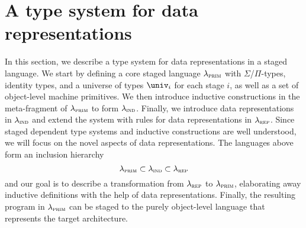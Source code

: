 \newcommand{\lambdaprim}{\lambda_{\textsc{prim}}}
\newcommand{\lambdaind}{\lambda_{\textsc{ind}}}
\newcommand{\lambdarep}{\lambda_{\textsc{rep}}}

\newcommand{\lab}[1]{{\ensuremath{\color{blue}{\mathsf{#1}}}}}
\newcommand{\kwd}[1]{\mta{\myuline{#1}}}
\newcommand{\Sdata}[2]{\kwd{data} \ \lab{#1} \, {#2} : \univ_1}
\newcommand{\Sctor}[4]{\kwd{ctor} \ \lab{#1} \, {#2} : \lab{#3}\, {#4}}
\newcommand{\Sctorvar}[4]{\kwd{ctor} \ #1 \, {#2} : \lab{#3}\, {#4}}
\newcommand{\Sfun}[3]{\kwd{fun} \ \lab{#1} : {#2} = {#3}}
\newcommand{\isConcrete}[1]{{#1}\ \inte{concrete}}
\newcommand{\Srepr}[4]{\kwd{repr} \ \lab{#2}\, {#3}\ \kwd{as}\ {#4}}
\newcommand{\Sreprconst}[3]{\kwd{repr} \ \lab{#2}\ \kwd{as}\ {#3}}
\newcommand{\Sreprvar}[4]{\kwd{repr} \ {#2}\, {#3}\ \kwd{as}\ {#4}}
\newcommand{\Sclosed}[2]{\kwd{closed}\ #1 \ #2}
\newcommand{\DeltaFor}[1]{\Delta_{\lab{#1}}}
\newcommand{\Trepr}[1]{\mta{repr}\, {#1}}
\newcommand{\TRepr}[1]{\mta{Repr}\, {#1}}
\newcommand{\Crepr}[1]{\text{$\Downarrow$} {#1}}
\newcommand{\crepr}[1]{\text{$\downarrow$} {#1}}
\newcommand{\isLabNotIn}[2]{\lab{#1}\ \inte{label} \notin {#2}}
\newcommand{\caselab}[1]{\lab{\textrm{case}_{#1}}}

\section{A type system for data representations}\label{sec:type-system}

In this section, we describe a type system for data representations in a staged
language. We start by defining a core staged language $\lambdaprim$ with
$\Sigma$/$\Pi$-types, identity types, and a universe of types $\univ_i$ for
each stage $i$, as well as a set of object-level machine primitives. We then
introduce inductive constructions in the meta-fragment of $\lambdaprim$ to form
$\lambdaind$. Finally, we introduce data representations in $\lambdaind$ and
extend the system with rules for data representations in $\lambdarep$. Since
staged dependent type systems and inductive constructions are well understood,
we will focus on the novel aspects of data representations. The languages above
form an inclusion hierarchy
\[
  \lambdaprim \subset \lambdaind \subset \lambdarep
\]
and our goal is to describe a transformation from $\lambdarep$ to
$\lambdaprim$, elaborating away inductive definitions with the help of data
representations. Finally, the resulting program in $\lambdaprim$ can be staged
to the purely object-level language that represents the target architecture.

